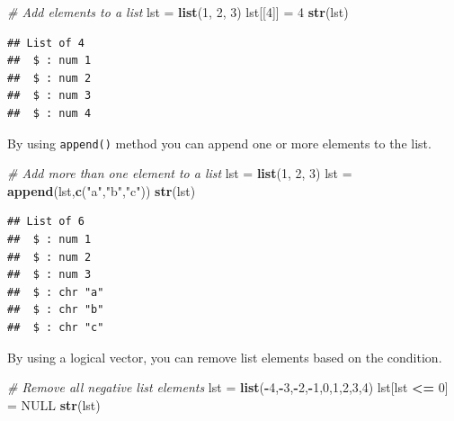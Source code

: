 \documentclass[
]{book}
\newenvironment{Shaded}{\begin{snugshade}}{\end{snugshade}}
\newcommand{\CommentTok}[1]{\textcolor[rgb]{0.56,0.35,0.01}{\textit{#1}}}
\newcommand{\DecValTok}[1]{\textcolor[rgb]{0.00,0.00,0.81}{#1}}
\newcommand{\KeywordTok}[1]{\textcolor[rgb]{0.13,0.29,0.53}{\textbf{#1}}}
\newcommand{\NormalTok}[1]{#1}
\newcommand{\OperatorTok}[1]{\textcolor[rgb]{0.81,0.36,0.00}{\textbf{#1}}}
\newcommand{\OtherTok}[1]{\textcolor[rgb]{0.56,0.35,0.01}{#1}}
\newcommand{\StringTok}[1]{\textcolor[rgb]{0.31,0.60,0.02}{#1}}
\begin{document}
\begin{Shaded}
\begin{Highlighting}[]
\CommentTok{# Add elements to a list}
\NormalTok{lst =}\StringTok{ }\KeywordTok{list}\NormalTok{(}\DecValTok{1}\NormalTok{, }\DecValTok{2}\NormalTok{, }\DecValTok{3}\NormalTok{)}
\NormalTok{lst[[}\DecValTok{4}\NormalTok{]] =}\StringTok{ }\DecValTok{4}
\KeywordTok{str}\NormalTok{(lst)}
\end{Highlighting}
\end{Shaded}

\begin{verbatim}
## List of 4
##  $ : num 1
##  $ : num 2
##  $ : num 3
##  $ : num 4
\end{verbatim}

By using \texttt{append()} method you can append one or more elements to the list.

\begin{Shaded}
\begin{Highlighting}[]
\CommentTok{# Add more than one element to a list}
\NormalTok{lst =}\StringTok{ }\KeywordTok{list}\NormalTok{(}\DecValTok{1}\NormalTok{, }\DecValTok{2}\NormalTok{, }\DecValTok{3}\NormalTok{)}
\NormalTok{lst =}\StringTok{ }\KeywordTok{append}\NormalTok{(lst,}\KeywordTok{c}\NormalTok{(}\StringTok{"a"}\NormalTok{,}\StringTok{"b"}\NormalTok{,}\StringTok{"c"}\NormalTok{))}
\KeywordTok{str}\NormalTok{(lst)}
\end{Highlighting}
\end{Shaded}

\begin{verbatim}
## List of 6
##  $ : num 1
##  $ : num 2
##  $ : num 3
##  $ : chr "a"
##  $ : chr "b"
##  $ : chr "c"
\end{verbatim}

By using a logical vector, you can remove list elements based on the condition.

\begin{Shaded}
\begin{Highlighting}[]
\CommentTok{# Remove all negative list elements}
\NormalTok{lst =}\StringTok{ }\KeywordTok{list}\NormalTok{(}\OperatorTok{-}\DecValTok{4}\NormalTok{,}\OperatorTok{-}\DecValTok{3}\NormalTok{,}\OperatorTok{-}\DecValTok{2}\NormalTok{,}\OperatorTok{-}\DecValTok{1}\NormalTok{,}\DecValTok{0}\NormalTok{,}\DecValTok{1}\NormalTok{,}\DecValTok{2}\NormalTok{,}\DecValTok{3}\NormalTok{,}\DecValTok{4}\NormalTok{)}
\NormalTok{lst[lst }\OperatorTok{<=}\StringTok{ }\DecValTok{0}\NormalTok{] =}\StringTok{ }\OtherTok{NULL}
\KeywordTok{str}\NormalTok{(lst)}
\end{Highlighting}
\end{Shaded}
\end{document}
